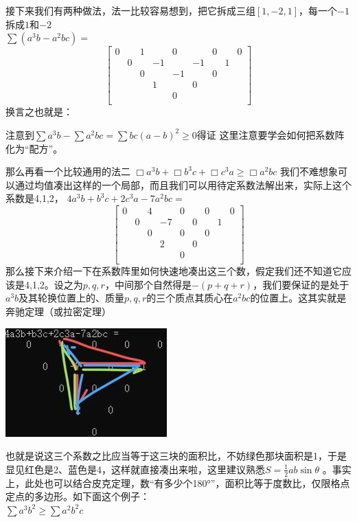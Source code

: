 \documentclass[UTF8]{ctexart}
\begin{document}
接下来我们有两种做法，法一比较容易想到，把它拆成三组$ [1,-2,1] $，每一个$ -1 $拆成$ 1 $和$ -2 $\\
$ \displaystyle \sum (a^{3} b-a^{2} b c)= $
\renewcommand*{\arraystretch}{1.732}\[\left[\begin{matrix}
	0& &1& &0& &0& &0\\
	&0& &-1& &-1& &1&\\
	& &0& &-1& &0& &\\
	& & &1& &0& & &\\
	& & & &0& & & &\\
\end{matrix}\right]\]
换言之也就是：\\
\begin{center}
	注意到$ \displaystyle \sum a^{3} b-\displaystyle \sum a^{2} b c=\displaystyle \sum b c(a-b)^{2} \geq 0 $得证
	这里注意要学会如何把系数阵化为“配方”。
\end{center}
那么再看一个比较通用的法二
$ \Box a^{3} b+\Box b^{3} c+\Box c^{3} a \geq \Box a^{2} b c $
我们不难想象可以通过均值凑出这样的一个局部，而且我们可以用待定系数法解出来，实际上这个系数是4,1,2，
$ 4a^{3}b+b^{3}c+2c^{3}a-7a^{2}bc= $\\
\renewcommand*{\arraystretch}{1.732}\[\left[\begin{matrix}
	0& &4& &0& &0& &0\\
	& 0& &-7& &0& &1&\\
	& &0& &0& &0& &\\
	& & &2& &0& & &\\
	& & & &0& & & &\\
\end{matrix}\right]\]
那么接下来介绍一下在系数阵里如何快速地凑出这三个数，假定我们还不知道它应该是4,1,2。设之为$ p,q,r $，中间那个自然得是$ -(p+q+r) $，我们要保证的是处于$ a^{3}b $及其轮换位置上的、质量$ p,q,r $的三个质点其质心在$ a^{2}bc $的位置上。这其实就是奔驰定理（或拉密定理）

\begin{center}
	\includegraphics[width=0.4\linewidth]{13}
\end{center}

也就是说这三个系数之比应当等于这三块的面积比，不妨绿色那块面积是1，于是显见红色是2、蓝色是4，这样就直接凑出来啦，这里建议熟悉$ S=\displaystyle \frac{1}{2}ab  \sin \theta $
。事实上，此处也可以结合皮克定理，数“有多少个180°”，面积比等于度数比，仅限格点定点的多边形。如下面这个例子：\\
$ \displaystyle  \sum a^{3} b^{2} \geq \displaystyle  \sum a^{2} b^{2} c $
\end{document}
